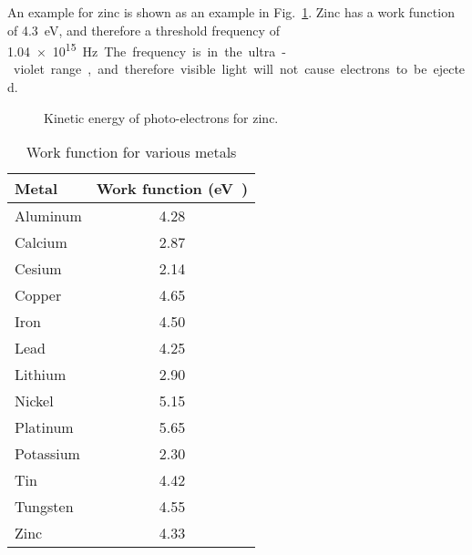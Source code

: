 An example for zinc is shown as an example in Fig.~\ref{fig:zinc}. Zinc has a
work function of \SI{4.3}{\electronvolt}, and therefore a threshold frequency of
\SI{1.04e15}\hertz. The frequency is in the ultra-violet range, and therefore
visible light will not cause electrons to be ejected.
\begin{figure}[ht]
  \centering
  \caption{Kinetic energy of photo-electrons for zinc.}
  \label{fig:zinc}
\end{figure}

\begin{table}[ht]
  \centering
  \begin{tabular}{l|c}
    \rowcolor{pink}
    \textbf{Metal} & \textbf{Work function} (\si\electronvolt) \\ \hline
    Aluminum & 4.28 \\ \hline
    Calcium  & 2.87 \\ \hline
    Cesium   & 2.14 \\ \hline
    Copper   & 4.65 \\ \hline
    Iron     & 4.50 \\ \hline
    Lead     & 4.25 \\ \hline
    Lithium  & 2.90 \\ \hline
    Nickel   & 5.15 \\ \hline
    Platinum & 5.65 \\ \hline
    Potassium & 2.30 \\ \hline
    Tin      & 4.42 \\ \hline
    Tungsten & 4.55 \\ \hline
    Zinc     & 4.33 \\
  \end{tabular}
  \caption{Work function for various metals}
  \label{tabl:work-function}
\end{table}
%  
%
%
%
%
